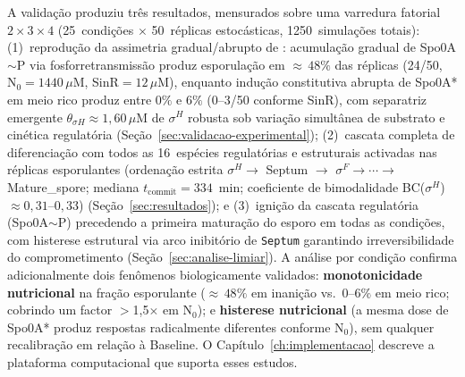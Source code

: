 A validação produziu três resultados, mensurados sobre uma varredura
fatorial $2 \times 3 \times 4$ (25~condições $\times$ 50~réplicas
estocásticas, 1250~simulações totais):
(1)~reprodução da assimetria gradual/abrupto de \textcite{Fujita2005}:
acumulação gradual de Spo0A${\sim}$P via fosforretransmissão produz esporulação
em ${\approx}\,48\%$ das réplicas (24/50, $\text{N}_0=1440\,\mu$M,
SinR$=12\,\mu$M), enquanto indução constitutiva abrupta de Spo0A* em meio
rico produz entre $0\%$ e $6\%$ (0--3/50 conforme SinR), com separatriz
emergente $\theta_{\sigma H} \approx 1{,}60\,\mu$M de $\sigma^H$ robusta sob
variação simultânea de substrato e cinética regulatória
(Seção~\ref{sec:validacao-experimental});
(2)~cascata completa de diferenciação com todos as 16~espécies
regulatórias e estruturais activadas nas réplicas esporulantes
(ordenação estrita $\sigma^H \to$ Septum $\to$ $\sigma^F \to \cdots \to$
Mature\_spore; mediana $t_{\text{commit}} = 334$~min; coeficiente de
bimodalidade BC($\sigma^H$) $\approx 0{,}31$--$0{,}33$)
(Seção~\ref{sec:resultados}); e
(3)~ignição da cascata regulatória (Spo0A${\sim}$P) precedendo a
primeira maturação do esporo em todas as condições, com histerese
estrutural via arco inibitório de \texttt{Septum} garantindo
irreversibilidade do comprometimento
(Seção~\ref{sec:analise-limiar}).
A análise por condição confirma adicionalmente dois fenômenos
biologicamente validados: \textbf{monotonicidade nutricional} na fração
esporulante (${\approx}\,48\%$ em inanição vs.\ $0$--$6\%$ em meio rico;
cobrindo um factor $>$1,5$\times$ em $\text{N}_0$); e
\textbf{histerese nutricional} (a mesma dose de Spo0A* produz respostas
radicalmente diferentes conforme $\text{N}_0$), sem qualquer
recalibração em relação à Baseline.
O Capítulo~\ref{ch:implementacao} descreve a plataforma computacional que
suporta esses estudos.

